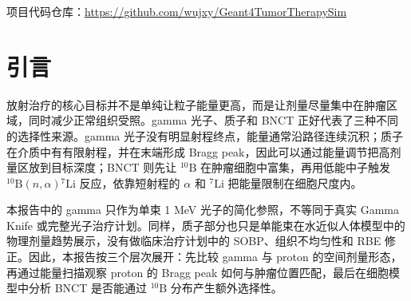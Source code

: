 \documentclass[12pt,hyperref,a4paper,UTF8,fontset=fandol]{ctexart}
\begin{document}
\cover
\thispagestyle{empty}

\newpage
\begin{abstract}
\sloppy
本项目基于 Geant4 搭建了一个从厘米尺度人体模型到微米尺度细胞模型的多尺度肿瘤放疗模拟程序，用来比较三类放疗机制：gamma 光子照射、质子治疗和硼中子俘获治疗（BNCT）。报告分为两个相互衔接的部分：Q1 先在简化人体模型中比较 1 MeV gamma 与 proton 的宏观剂量分布；Q2 再在肿瘤区内构建混合细胞模型，研究 $^{10}\mathrm{B}$ 在肿瘤细胞内不同分布（uniform / cytoplasm / shell）时的细胞尺度剂量响应。

Q1 的结果表明，gamma 沿入射路径呈弥散沉积，没有 Bragg peak；proton 则可以通过调节入射能量把 Bragg peak 放入肿瘤区。在当前肿瘤中心深度约 5 cm、沿束流方向厚 2 cm 的几何下，60--100 MeV proton 扫描中 85 MeV 的肿瘤沉积能量分数最高，约为 34.9\%。

Q2 的结果表明，shell 模式确实会在细胞外侧形成明显的“硼壳热源”，但由于 $\alpha$ 和 $^{7}\mathrm{Li}$ 的射程只有微米量级，shell 模式进入细胞核的能量反而低于 uniform。跨疗法对照中，在把肿瘤细胞平均剂量统一归一到 1 Gy 后，BNCT 的细胞尺度选择性约为 0.93，明显高于 gamma/proton 的约 0.50。这些结果说明：质子治疗的优势主要来自宏观空间剂量可控性，而 BNCT 的优势主要来自 $^{10}\mathrm{B}$ 富集带来的细胞尺度选择性。
\par\end{abstract}

\noindent 项目代码仓库：\url{https://github.com/wujxy/Geant4TumorTherapySim}

\newpage
\tableofcontents
\newpage

\section{引言}

放射治疗的核心目标并不是单纯让粒子能量更高，而是让剂量尽量集中在肿瘤区域，同时减少正常组织受照。gamma 光子、质子和 BNCT 正好代表了三种不同的选择性来源。gamma 光子没有明显射程终点，能量通常沿路径连续沉积；质子在介质中有有限射程，并在末端形成 Bragg peak，因此可以通过能量调节把高剂量区放到目标深度\cite{mohan2022proton}；BNCT 则先让 $^{10}\mathrm{B}$ 在肿瘤细胞中富集，再用低能中子触发 $^{10}\mathrm{B}(n,\alpha){}^{7}\mathrm{Li}$ 反应，依靠短射程的 $\alpha$ 和 $^{7}\mathrm{Li}$ 把能量限制在细胞尺度内\cite{nedunchezhian2016bnct}。

本报告中的 gamma 只作为单束 1 MeV 光子的简化参照，不等同于真实 Gamma Knife 或完整光子治疗计划\cite{desai2020gamma}。同样，质子部分也只是单能束在水近似人体模型中的物理剂量趋势展示，没有做临床治疗计划中的 SOBP、组织不均匀性和 RBE 修正。因此，本报告按三个层次展开：先比较 gamma 与 proton 的空间剂量形态，再通过能量扫描观察 proton 的 Bragg peak 如何与肿瘤位置匹配，最后在细胞模型中分析 BNCT 是否能通过 $^{10}\mathrm{B}$ 分布产生额外选择性。
\end{document}
